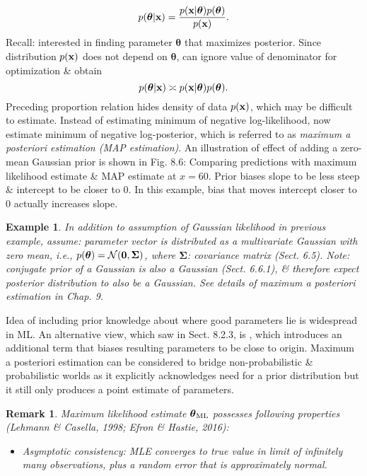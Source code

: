 \documentclass{article}
\newtheorem{example}{Example}
\newtheorem{remark}{Remark}
\begin{document}
\begin{itemize}
\begin{itemize}
\begin{itemize}
\begin{equation}
				p(\boldsymbol{\theta}|{\bf x}) = \frac{p({\bf x}|\boldsymbol{\theta})p(\boldsymbol{\theta})}{p({\bf x})}.
			\end{equation}
			Recall: interested in finding parameter $\boldsymbol{\theta}$ that maximizes posterior. Since distribution $p({\bf x})$ does not depend on $\boldsymbol{\theta}$, can ignore value of denominator for optimization \& obtain
			\begin{equation}
				p(\boldsymbol{\theta}|{\bf x})\asymp p({\bf x}|\boldsymbol{\theta})p(\boldsymbol{\theta}).
			\end{equation}
			Preceding proportion relation hides density of data $p({\bf x})$, which may be difficult to estimate. Instead of estimating minimum of negative log-likelihood, now estimate minimum of negative log-posterior, which is referred to as {\it maximum a posteriori estimation (MAP estimation)}. An illustration of effect of adding a zero-mean Gaussian prior is shown in {\sf Fig. 8.6: Comparing predictions with maximum likelihood estimate \& MAP estimate at $x = 60$. Prior biases slope to be less steep \& intercept to be closer to 0. In this example, bias that moves intercept closer to 0 actually increases slope.}
			\begin{example}
				In addition to assumption of Gaussian likelihood in previous example, assume: parameter vector is distributed as a multivariate Gaussian with zero mean, i.e., $p(\boldsymbol{\theta}) = {\cal N}({\bf0},\boldsymbol{\Sigma})$, where $\boldsymbol{\Sigma}$: covariance matrix (Sect. 6.5). Note: conjugate prior of a Gaussian is also a Gaussian (Sect. 6.6.1), \& therefore expect posterior distribution to also be a Gaussian. See details of maximum a posteriori estimation in Chap. 9.
			\end{example}
			Idea of including prior knowledge about where good parameters lie is widespread in ML. An alternative view, which saw in Sect. 8.2.3, is , which introduces an additional term that biases resulting parameters to be close to origin. Maximum a posteriori estimation can be considered to bridge non-probabilistic \& probabilistic worlds as it explicitly acknowledges need for a prior distribution but it still only produces a point estimate of parameters.
			\begin{remark}
				Maximum likelihood estimate $\boldsymbol{\theta}_{\rm ML}$ possesses following properties (Lehmann \& Casella, 1998; Efron \& Hastie, 2016):
				\begin{itemize}
					\item Asymptotic consistency: MLE converges to true value in limit of infinitely many observations, plus a random error that is approximately normal.

\end{itemize}
\end{remark}
\end{itemize}
\end{itemize}
\end{itemize}
\end{document}
